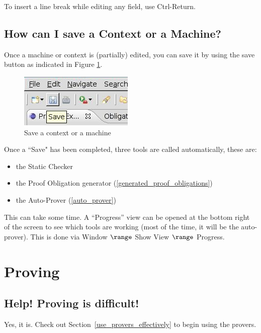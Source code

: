 To insert a line break while editing any field, use Ctrl-Return.

\subsection{How can I save a Context or a Machine?}

Once a machine or context is (partially) edited, you can save it by using the save button as indicated in Figure \ref{fig_faq_saveaction}.

\begin{figure}[!ht]
\begin{center}
	\includegraphics{img/faq/faq_saveaction.png}
	\caption{Save a context or a machine}
	\label{fig_faq_saveaction}
\end{center}
\end{figure}

Once a ``Save" has been completed, three tools are called automatically, these are:

\begin{itemize}
	\item the Static Checker
	\item the Proof Obligation generator (\ref{generated_proof_obligations})
	\item the Auto-Prover (\ref{auto_prover})
\end{itemize}

This can take some time. A ``Progress'' view can be opened at the bottom right of the screen to see which tools are working (most of the time, it will be the auto-prover).  This is done via Window $\range$ Show View $\range$ Progress.

\section{Proving}

\subsection{Help!  Proving is difficult!}

Yes, it is.  Check out Section~\ref{use_provers_effectively} to begin using the provers.


